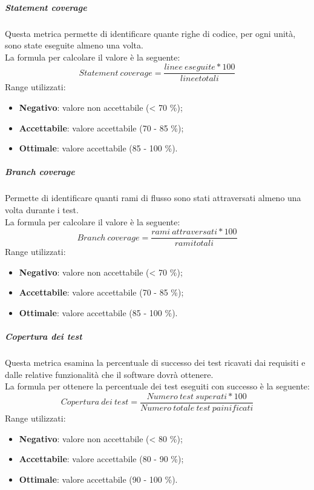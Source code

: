 \documentclass[../PianoDiQualifica.tex]{subfiles}
\begin{document}
			\subparagraph{Statement coverage}
			Questa metrica permette di identificare quante righe di codice, per ogni unità, sono state eseguite almeno una volta.\\La formula per calcolare il valore è la seguente:
			\begin{equation*}
				Statement \ coverage = \frac{linee \ eseguite * 100}{linee totali}
			\end{equation*}
				Range utilizzati:
				\begin{itemize}
					\item \textbf{Negativo}: valore non accettabile (< 70 \%);
					\item \textbf{Accettabile}: valore accettabile (70 - 85 \%);
					\item \textbf{Ottimale}: valore accettabile (85 - 100 \%).
				\end{itemize}

			\subparagraph{Branch coverage}
			Permette di identificare quanti rami di flusso sono stati attraversati almeno una volta durante i test.\\La formula per calcolare il valore è la seguente:
			\begin{equation*}
				Branch \ coverage = \frac{rami \ attraversati* 100}{rami totali}
			\end{equation*}
				Range utilizzati:
				\begin{itemize}
					\item \textbf{Negativo}: valore non accettabile (< 70 \%);
					\item \textbf{Accettabile}: valore accettabile (70 - 85 \%);
					\item \textbf{Ottimale}: valore accettabile (85 - 100 \%).
				\end{itemize}

			\subparagraph{Copertura dei test}
			Questa metrica esamina la percentuale di successo dei test ricavati dai requisiti e dalle relative funzionalità che il software dovrà ottenere.\\La formula per ottenere la percentuale dei test eseguiti con successo è la seguente:
			\begin{equation*}
				Copertura \ dei \ test = \frac{Numero \ test \ superati* 100}{Numero \ totale \ test \ painificati}
			\end{equation*}
				Range utilizzati:
				\begin{itemize}
					\item \textbf{Negativo}: valore non accettabile (< 80 \%);
					\item \textbf{Accettabile}: valore accettabile (80 - 90 \%);
					\item \textbf{Ottimale}: valore accettabile (90 - 100 \%).
				\end{itemize}
\end{document}
